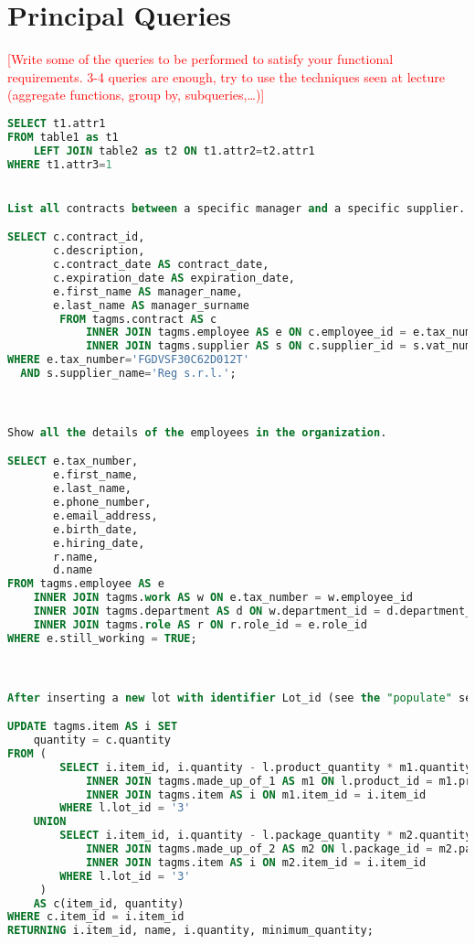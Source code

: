 \section{Principal Queries}
\textcolor{red}{[Write some of the queries to be performed to satisfy your functional requirements. 3-4 queries are enough, try to use the techniques seen at lecture (aggregate functions, group by, subqueries,…)]}

\begin{lstlisting}[language=SQL,
keywordstyle=\color{blue},
stringstyle=\color{mauve},
showstringspaces=false,
basicstyle=\ttfamily\footnotesize]
SELECT t1.attr1
FROM table1 as t1
    LEFT JOIN table2 as t2 ON t1.attr2=t2.attr1 
WHERE t1.attr3=1


List all contracts between a specific manager and a specific supplier.

SELECT c.contract_id,
       c.description,
       c.contract_date AS contract_date,
       c.expiration_date AS expiration_date,
       e.first_name AS manager_name,
       e.last_name AS manager_surname
		FROM tagms.contract AS c
		    INNER JOIN tagms.employee AS e ON c.employee_id = e.tax_number
		    INNER JOIN tagms.supplier AS s ON c.supplier_id = s.vat_number
WHERE e.tax_number='FGDVSF30C62D012T'
  AND s.supplier_name='Reg s.r.l.';



Show all the details of the employees in the organization.

SELECT e.tax_number,
       e.first_name,
       e.last_name,
       e.phone_number,
       e.email_address,
       e.birth_date,
       e.hiring_date,
       r.name,
       d.name
FROM tagms.employee AS e
    INNER JOIN tagms.work AS w ON e.tax_number = w.employee_id
    INNER JOIN tagms.department AS d ON w.department_id = d.department_id
    INNER JOIN tagms.role AS r ON r.role_id = e.role_id
WHERE e.still_working = TRUE;



After inserting a new lot with identifier Lot_id (see the "populate" section), decrease the quantity of the items involved in the production of a lot.

UPDATE tagms.item AS i SET
    quantity = c.quantity
FROM (
        SELECT i.item_id, i.quantity - l.product_quantity * m1.quantity AS quantity FROM tagms.lot AS l
            INNER JOIN tagms.made_up_of_1 AS m1 ON l.product_id = m1.product_id
            INNER JOIN tagms.item AS i ON m1.item_id = i.item_id
        WHERE l.lot_id = '3'
    UNION
        SELECT i.item_id, i.quantity - l.package_quantity * m2.quantity AS quantity FROM tagms.lot AS l
            INNER JOIN tagms.made_up_of_2 AS m2 ON l.package_id = m2.package_id
            INNER JOIN tagms.item AS i ON m2.item_id = i.item_id
        WHERE l.lot_id = '3'
     )
    AS c(item_id, quantity)
WHERE c.item_id = i.item_id
RETURNING i.item_id, name, i.quantity, minimum_quantity;




\end{lstlisting}

